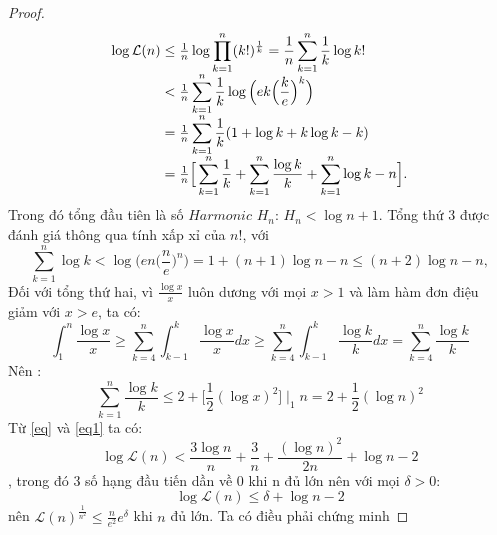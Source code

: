 \documentclass[a4paper, 12pt]{report}
\begin{document}
\begin{proof}
\begin{equation}
\begin{array}{l@{}l}
			\log\mathcal{L}(n)
			&{} \leq \frac{1}{n}\log \displaystyle \prod_{k=1}^{n}(k!)^{\frac{1}{k}} = \frac{1}{n} \displaystyle \sum_{k=1}^{n}\frac{1}{k}\log k! \\ 
			&{} < \frac{1}{n}\displaystyle \sum_{k=1}^{n}\frac{1}{k}\log\Big( ek \Big(\frac{k}{e}\Big)^{k} \Big) \\
			&{} = \frac{1}{n} \displaystyle \sum_{k=1}^{n}\frac{1}{k}(1 +\log k + k\log k -k) \\
			&{} = \frac{1}{n} \Big[\displaystyle \sum_{k=1}^{n}\frac{1}{k} + \displaystyle \sum_{k=1}^{n}\frac{\log k}{k} + \displaystyle \sum_{k=1}^{n}\log k -n \Big].
		\end{array}
		\end{equation}
		Trong đó tổng đầu tiên là số $Harmonic$ $H_n$: $H_n < \log n +1$. Tổng thứ 3 được đánh giá thông qua tính xấp xỉ của $n!$, với 
		\begin{equation}
			\displaystyle \sum_{k=1}^{n} \log k < \log\Big( en\Big(\frac{n}{e}\Big)^{n}\Big) = 1+ (n+1)\log n -n \leq (n+2 )\log n - n, \label{eq}
		\end{equation}
		Đối với tổng thứ hai, vì $\frac{\log x}{x}$ luôn dương với mọi $x>1$ và làm hàm đơn điệu giảm với $x >e$, ta có:
		\begin{equation*}
			\int_{1}^{n}\frac{\log x}{x} \geq \displaystyle \sum_{k=4}^{n}\int_{k-1}^{k}\frac{\log x}{x}dx \geq \displaystyle \sum_{k=4}^{n}\int_{k-1}^{k}\frac{\log k}{k}dx = \displaystyle \sum_{k=4}^{n}\frac{\log k}{k}
		\end{equation*}
		Nên : 
		\begin{equation}
			 \displaystyle \sum_{k=1}^{n}\frac{\log k}{k} \leq 2 + \Big[\frac{1}{2}(\log x)^2\Big]\mid_{1}{n} = 2+ \frac{1}{2}(\log n)^2 \label{eq1}
		\end{equation}
Từ \eqref{eq} và \eqref{eq1} ta có: 
\begin{equation*}
	\log \mathcal{L}(n) < \frac{3\log n}{n} + \frac{3}{n} + \frac{(\log n)^2}{2n} + \log n -2
\end{equation*},
trong đó 3 số hạng đầu tiến dần về 0 khi n đủ lớn nên với mọi $\delta >0$:
\begin{equation*}
	\log \mathcal{L}(n) \leq \delta +\log n -2 	
\end{equation*}
nên $	\mathcal{L}(n)^\frac{1}{n^2} \leq \frac{n}{e^2}e^{\delta}$ khi $n$ đủ lớn. Ta có điều phải chứng minh
\end{proof}










%
%
%
\end{document}
